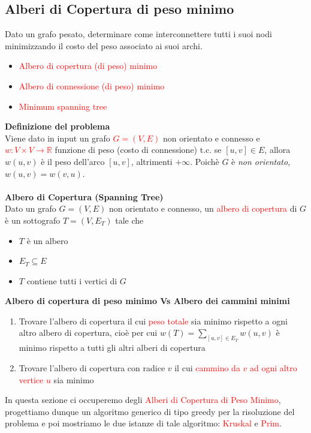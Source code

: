 \documentclass[../cheatSheetAlgoritmi.tex]{subfiles}
\begin{document}
\subsection{Alberi di Copertura di peso minimo}
Dato un grafo pesato, determinare come interconnettere tutti i suoi nodi minimizzando il costo del peso associato ai suoi archi.
\begin{itemize}
	\item \textcolor{red}{Albero di copertura (di peso) minimo}
	\item \textcolor{red}{Albero di connessione (di peso) minimo}
	\item \textcolor{red}{Minimum spanning tree}
\end{itemize}
\textbf{Definizione del problema}\\
Viene dato in input un grafo \textcolor{red}{$G = (V, E)$} non orientato e connesso e  \textcolor{red}{$w: V \times V \rightarrow \mathbb{R}$} funzione di peso (costo di connessione) t.c. se $[u, v] \in E$, allora $w(u, v)$ è il peso dell'arco $[u, v]$, altrimenti $+\infty$. Poichè $G$ è \emph{non orientato}, $w(u, v) = w(v, u)$.\\\\
\textbf{Albero di Copertura (Spanning Tree)}\\
Dato un grafo $G = (V, E)$ non orientato e connesso, un \textcolor{red}{albero di copertura} di $G$ è un sottografo $T = (V, E_{T})$ tale che 
\begin{itemize}
	\item $T$ è un albero
	\item $E_{T} \subseteq E$
	\item $T$ contiene tutti i vertici di $G$
\end{itemize}
\textbf{Albero di copertura di peso minimo Vs Albero dei cammini minimi}
\begin{enumerate}
	\item Trovare l'albero di copertura il cui \textcolor{red}{peso totale} sia minimo rispetto a ogni altro albero di copertura, cioè per cui $w(T) = \sum_{[u, v] \in E_{T}}w(u, v)$ è minimo rispetto a tutti gli altri alberi di copertura
	\item Trovare l'albero di copertura con radice $v$ il cui \textcolor{red}{cammino da $v$ ad ogni altro vertice $u$} sia minimo
\end{enumerate}
In questa sezione ci occuperemo degli \textcolor{red}{Alberi di Copertura di Peso Minimo}, progettiamo dunque un algoritmo generico di tipo greedy per la risoluzione del problema e poi mostriamo le due istanze di tale algoritmo: \textcolor{red}{Kruskal} e \textcolor{red}{Prim}.\\
\end{document}
